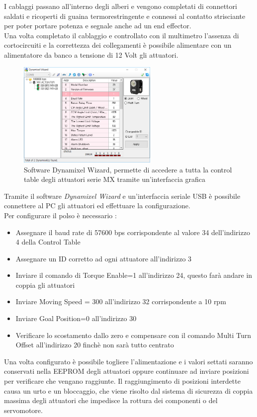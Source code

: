 \documentclass[%
corpo=11pt,
twoside,
 stile=classica,
oldstyle,
greek,%
]{toptesi}
\begin{document}
	I cablaggi passano all'interno degli alberi e vengono completati di connettori saldati e ricoperti di guaina termorestringente e connessi al contatto strisciante per poter portare potenza e segnale anche ad un end effector. \\
	Una volta completato il cablaggio e controllato con il multimetro l'assenza di cortocircuiti e la correttezza dei collegamenti è possibile alimentare con un alimentatore da banco a tensione di 12 Volt gli attuatori. \\
	
	\begin{figure}
		\centering
		\includegraphics[width=0.6\textwidth]{image/wizard.png}
		
		\caption{Software Dynamixel Wizard, permette di accedere a tutta la control table degli attuatori serie MX tramite un'interfaccia grafica}
		\label{fig:wizard}
	\end{figure}
	
	Tramite il software \textit{Dynamixel Wizard} e un'interfaccia seriale USB è possibile connettere al PC gli attuatori ed effettuare la configurazione. \\
	Per configurare il polso è necessario :
	\begin{itemize}
		\item Assegnare il baud rate di 57600 bps corrispondente  al valore 34 dell'indirizzo 4 della Control Table
		\item Assegnare un ID corretto ad ogni attuatore all'indirizzo 3
		\item Inviare il comando di Torque Enable=1 all'indirizzo 24, questo farà andare in coppia gli attuatori
		\item Inviare Moving Speed = 300 all'indirizzo 32 corrispondente a 10 rpm 
		\item Inviare  Goal Position=0 all'indirizzo 30
		\item Verificare lo scostamento dallo zero e compensare con il comando Multi Turn Offset all'indirizzo 20 finchè non sarà tutto centrato
		
	\end{itemize}
	Una volta configurato è possibile togliere l'alimentazione e i valori settati saranno conservati nella EEPROM degli attuatori oppure continuare ad inviare posizioni per verificare che vengano raggiunte. 
	Il raggiungimento di posizioni interdette causa un urto e un bloccaggio, che viene risolto dal sistema di sicurezza di coppia massima degli attuatori che impedisce la rottura dei componenti o del servomotore. 
	
\end{document}
